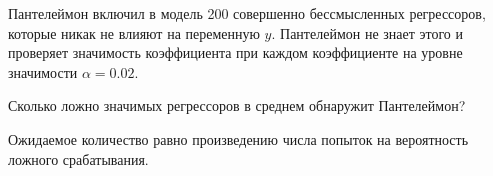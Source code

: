 
\begin{question}
Пантелеймон включил в модель 200 совершенно бессмысленных регрессоров, которые никак не влияют
на переменную \(y\).
Пантелеймон не знает этого и проверяет значимость коэффициента при каждом коэффициенте на уровне значимости \(\alpha = 0.02\).

Сколько ложно значимых регрессоров в среднем обнаружит Пантелеймон?
\end{question}

\begin{solution}
Ожидаемое количество равно произведению числа попыток на вероятность ложного срабатывания.
\end{solution}

